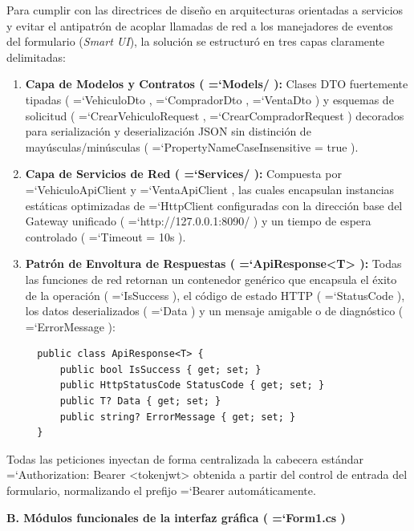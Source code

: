 \documentclass[11pt,a4paper]{article}
\renewcommand{\_}{\oldunderscore\allowbreak}
\DeclareRobustCommand{\texttt}[1]{%
  {\upshape\ttfamily\fontsize{9}{10.8}\selectfont\hyphenchar\font=`\-\relax #1}%
}
\begin{document}
\noindent Para cumplir con las directrices de diseño en arquitecturas orientadas a servicios y evitar el antipatrón de acoplar llamadas de red a los manejadores de eventos del formulario (\textit{Smart UI}), la solución se estructuró en tres capas claramente delimitadas:
\begin{enumerate}[leftmargin=*,itemsep=2pt,topsep=1pt]
  \item \textbf{Capa de Modelos y Contratos (\texttt{Models/}):} Clases DTO fuertemente tipadas (\texttt{VehiculoDto}, \texttt{CompradorDto}, \texttt{VentaDto}) y esquemas de solicitud (\texttt{CrearVehiculoRequest}, \texttt{CrearCompradorRequest}) decorados para serialización y deserialización JSON sin distinción de mayúsculas/minúsculas (\texttt{PropertyNameCaseInsensitive = true}).
  \item \textbf{Capa de Servicios de Red (\texttt{Services/}):} Compuesta por \texttt{VehiculoApiClient} y \texttt{VentaApiClient}, las cuales encapsulan instancias estáticas optimizadas de \texttt{HttpClient} configuradas con la dirección base del Gateway unificado (\texttt{http:\allowbreak{}/\allowbreak{}/\allowbreak{}127.\allowbreak{}0.\allowbreak{}0.\allowbreak{}1:\allowbreak{}8090/}) y un tiempo de espera controlado (\texttt{Timeout = 10s}).
  \item \textbf{Patrón de Envoltura de Respuestas (\texttt{ApiResponse<T>}):} Todas las funciones de red retornan un contenedor genérico que encapsula el éxito de la operación (\texttt{IsSuccess}), el código de estado HTTP (\texttt{StatusCode}), los datos deserializados (\texttt{Data}) y un mensaje amigable o de diagnóstico (\texttt{ErrorMessage}):
  {\small
  \begin{lstlisting}
  public class ApiResponse<T> {
      public bool IsSuccess { get; set; }
      public HttpStatusCode StatusCode { get; set; }
      public T? Data { get; set; }
      public string? ErrorMessage { get; set; }
  }
  \end{lstlisting}
  }
\end{enumerate}

\vspace{0.15cm}
\noindent Todas las peticiones inyectan de forma centralizada la cabecera estándar \texttt{Authorization: Bearer <token\_jwt>} obtenida a partir del control de entrada del formulario, normalizando el prefijo \texttt{Bearer} automáticamente.

\vspace{0.2cm}
\noindent\textbf{B. Módulos funcionales de la interfaz gráfica (\texttt{Form1.cs})}
\end{document}
